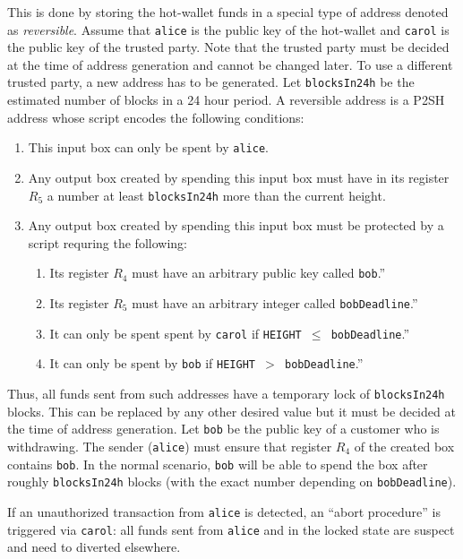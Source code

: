 \documentclass[11pt]{article}
\begin{document}
This is done by storing the hot-wallet funds in a special type of address denoted as {\em reversible}. Assume that \texttt{alice} is the public key of the hot-wallet and \texttt{carol} is the public key of the trusted party. Note that the trusted party must be decided at the time of address generation and cannot be changed later. To use a different trusted party, a new address has to be generated. Let \texttt{blocksIn24h} be the estimated number of blocks in a 24 hour period. A reversible address is a P2SH
address whose script encodes the following conditions:   
\begin{enumerate}
	\item This input box can only be spent by \texttt{alice}.
	\item Any output box created by spending this input box must have in its register $R_5$ a number at least \texttt{blocksIn24h} more than the current height. 
	\item Any output box created by spending this input box must be protected by a script requring the following: 	
	\begin{enumerate}
		\item Its register $R_4$ must have an arbitrary public key called \texttt{bob}.'' 
		\item Its register $R_5$ must have an arbitrary integer called \texttt{bobDeadline}.'' 
		\item It can only be spent spent by \texttt{carol} if \texttt{HEIGHT $\leq$ bobDeadline}.''
		\item It can only be spent by \texttt{bob} if \texttt{HEIGHT $>$ bobDeadline}.''	
	\end{enumerate}  
\end{enumerate}

Thus, all funds sent from such addresses have a temporary lock of \texttt{blocksIn24h} blocks. This can be replaced by any other desired value but it must be decided at the time of address generation. 
Let \texttt{bob} be the public key of a customer who is withdrawing. The sender (\texttt{alice}) must ensure that register $R_4$ of the created box contains \texttt{bob}. In the normal scenario, \texttt{bob} will be able to spend the box after roughly \texttt{blocksIn24h} blocks (with the exact number depending on \texttt{bobDeadline}). 

If an unauthorized transaction from \texttt{alice} is detected, an ``abort procedure'' is triggered via \texttt{carol}: all funds sent from \texttt{alice} and in the locked state are suspect and need to diverted elsewhere. %
\end{document}
